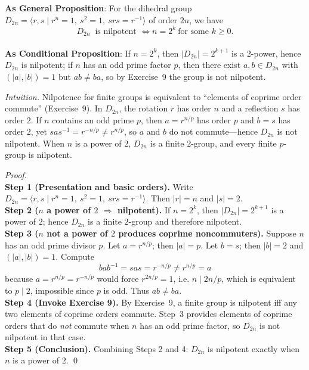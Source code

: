 \documentclass[12pt]{article}
\theoremstyle{definition}
\begin{document}
\noindent\textbf{As General Proposition}: For the dihedral group $D_{2n}=\langle r,s\mid r^{n}=1,\ s^{2}=1,\ srs=r^{-1}\rangle$ of order $2n$, we have
\[
D_{2n}\ \text{ is nilpotent } \iff n=2^{k}\ \text{for some }k\ge 0.
\]
\\

\noindent\textbf{As Conditional Proposition}: If $n=2^{k}$, then $|D_{2n}|=2^{k+1}$ is a $2$-power, hence $D_{2n}$ is nilpotent; if $n$ has an odd prime factor $p$, then there exist $a,b\in D_{2n}$ with $(|a|,|b|)=1$ but $ab\ne ba$, so by Exercise~9 the group is not nilpotent.\\

\newpage

\dotfill

\emph{Intuition.}
Nilpotence for finite groups is equivalent to “elements of coprime order commute” (Exercise~9). In $D_{2n}$, the rotation $r$ has order $n$ and a reflection $s$ has order $2$. If $n$ contains an odd prime $p$, then $a=r^{n/p}$ has order $p$ and $b=s$ has order $2$, yet $sas^{-1}=r^{-n/p}\ne r^{n/p}$, so $a$ and $b$ do not commute—hence $D_{2n}$ is not nilpotent. When $n$ is a power of $2$, $D_{2n}$ is a finite $2$-group, and every finite $p$-group is nilpotent.\\

\dotfill

\emph{Proof.}\\
\textbf{Step 1 (Presentation and basic orders).} Write $D_{2n}=\langle r,s\mid r^{n}=1,\ s^{2}=1,\ srs=r^{-1}\rangle$. Then $|r|=n$ and $|s|=2$.\\
\textbf{Step 2 ($n$ a power of $2$ $\Rightarrow$ nilpotent).} If $n=2^{k}$, then $|D_{2n}|=2^{k+1}$ is a power of $2$; hence $D_{2n}$ is a finite $2$-group and therefore nilpotent.\\
\textbf{Step 3 ($n$ not a power of $2$ produces coprime noncommuters).} Suppose $n$ has an odd prime divisor $p$. Let $a=r^{n/p}$; then $|a|=p$. Let $b=s$; then $|b|=2$ and $(|a|,|b|)=1$. Compute
\[
bab^{-1}=sas=r^{-n/p}\neq r^{n/p}=a
\]
because $a=r^{n/p}=r^{-n/p}$ would force $r^{2n/p}=1$, i.e. $n\mid 2n/p$, which is equivalent to $p\mid 2$, impossible since $p$ is odd. Thus $ab\ne ba$.\\
\textbf{Step 4 (Invoke Exercise 9).} By Exercise~9, a finite group is nilpotent iff any two elements of coprime orders commute. Step~3 provides elements of coprime orders that do \emph{not} commute when $n$ has an odd prime factor, so $D_{2n}$ is not nilpotent in that case.\\
\textbf{Step 5 (Conclusion).} Combining Steps 2 and 4: $D_{2n}$ is nilpotent exactly when $n$ is a power of $2$. \qed
\end{document}

